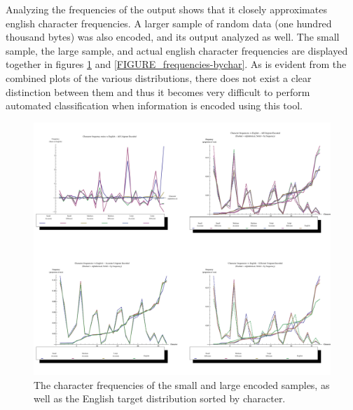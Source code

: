 \documentclass[12pt]{report}
\theoremstyle{remark}
\theoremstyle{definition}
\theoremstyle{definition}
\theoremstyle{definition}
\begin{document}
\begin{appendices}
Analyzing the frequencies of the output shows that it closely approximates
english character frequencies. A larger sample of random data (one hundred
thousand bytes) was also encoded, and its output analyzed as well. The small
sample, the large sample, and actual english character frequencies are displayed
together in figures \ref{FIGURE_frequencies-bytop} and
\ref{FIGURE_frequencies-bychar}. As is evident from the combined plots of the
various distributions, there does not exist a clear distinction between them and
thus it becomes very difficult to perform automated classification when
information is encoded using this tool.

\newpage

\begin{landscape}
\begin{figure}
\centering
\includegraphics[width=1.15\textwidth]{figures/plots_unigram.pdf}
\caption[Plot of character frequencies by frequency]{The character frequencies of the small and large encoded samples, as well as the English target distribution sorted by character.}
\label{FIGURE_frequencies-bytop}
\end{figure}
\end{landscape}

\newpage



\end{appendices}
\end{document}
